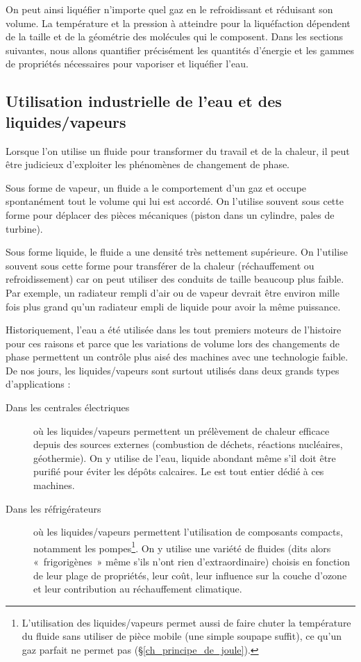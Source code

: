 		On peut ainsi liquéfier n’importe quel gaz en le refroidissant et réduisant son volume. La température et la pression à atteindre pour la liquéfaction dépendent de la taille et de la géométrie des molécules qui le composent. Dans les sections suivantes, nous allons quantifier précisément les quantités d’énergie et les gammes de propriétés nécessaires pour vaporiser et liquéfier l’eau.\onlyframabook{\dontbreakpage}
	
	\subsection{Utilisation industrielle de l’eau et des \mbox{liquides/vapeurs}}
	
		Lorsque l’on utilise un fluide pour transformer du travail et de la chaleur, il peut être judicieux d’exploiter les phénomènes de changement de phase.

		Sous forme de vapeur, un fluide a le comportement d’un gaz et occupe spontanément tout le volume qui lui est accordé. On l’utilise souvent sous cette forme pour déplacer des pièces mécaniques (piston dans un cylindre, pales de turbine).
		
		Sous forme liquide, le fluide a une densité très nettement supérieure. On l’utilise souvent sous cette forme pour transférer de la chaleur (réchauffement ou refroidissement) car on peut utiliser des conduits de taille beaucoup plus faible. Par exemple, un radiateur rempli d’air ou de vapeur devrait être environ mille fois plus grand qu’un radiateur empli de liquide pour avoir la même puissance.
		
		Historiquement, l’eau a été utilisée dans les tout premiers moteurs de l’histoire pour ces raisons et parce que les variations de volume lors des changements de phase permettent un contrôle plus aisé des machines avec une technologie faible. De nos jours, les liquides/vapeurs sont surtout utilisés dans deux grands types d’applications :
			\begin{description}
				\item [Dans les centrales électriques] où les liquides/vapeurs permettent un prélèvement de chaleur efficace depuis des sources externes (combustion de déchets, réactions nucléaires, géothermie). On y utilise de l’eau, liquide abondant même s’il doit être purifié pour éviter les dépôts calcaires. Le \coursneuf est tout entier dédié à ces machines.
				\item [Dans les réfrigérateurs] où les liquides/vapeurs permettent l’utilisation de composants compacts, notamment les pompes\footnote{L’utilisation des liquides/vapeurs permet aussi de faire chuter la température du fluide sans utiliser de pièce mobile (une simple soupape suffit), ce qu’un gaz parfait ne permet pas (\S\ref{ch_principe_de_joule}).}. On y utilise une variété de fluides (dits alors «~frigorigènes~» même s’ils n’ont rien d’extraordinaire) choisis en fonction de leur plage de propriétés, leur coût, leur influence sur la couche d’ozone et leur contribution au réchauffement climatique.
			\end{description}

